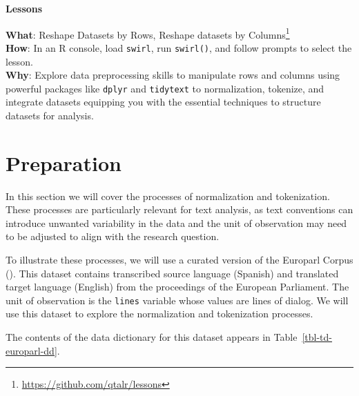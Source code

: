 \documentclass[
  letterpaper,
]{latex/krantz}
\theoremstyle{definition}
\theoremstyle{remark}
\DeclareRobustCommand{\href}[2]{#2\footnote{\url{#1}}}
\begin{document}
\begin{tcolorbox}[enhanced jigsaw, colback=white, colframe=quarto-callout-color-frame, leftrule=.75mm, opacityback=0, rightrule=.15mm, bottomrule=.15mm, toprule=.15mm, breakable, left=2mm, arc=.35mm]

\textbf{ Lessons}

\textbf{What}: \href{https://github.com/qtalr/lessons}{Reshape Datasets
by Rows, Reshape datasets by Columns}\\
\textbf{How}: In an R console, load \texttt{swirl}, run
\texttt{swirl()}, and follow prompts to select the lesson.\\
\textbf{Why}: Explore data preprocessing skills to manipulate rows and
columns using powerful packages like \texttt{dplyr} and
\texttt{tidytext} to normalization, tokenize, and integrate datasets
equipping you with the essential techniques to structure datasets for
analysis.

\end{tcolorbox}

\section{Preparation}\label{sec-td-preparation}

In this section we will cover the processes of normalization and
tokenization. These processes are particularly relevant for text
analysis, as text conventions can introduce unwanted variability in the
data and the unit of observation may need to be adjusted to align with
the research question.

To illustrate these processes, we will use a curated version of the
Europarl Corpus (). This dataset
contains transcribed source language (Spanish) and translated target
language (English) from the proceedings of the European Parliament. The
unit of observation is the \texttt{lines} variable whose values are
lines of dialog. We will use this dataset to explore the normalization
and tokenization processes.

The contents of the data dictionary for this dataset appears in
Table~\ref{tbl-td-europarl-dd}.
\end{document}
